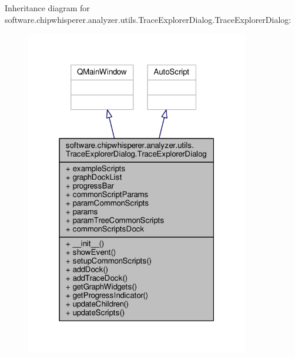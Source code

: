 Inheritance diagram for software.\+chipwhisperer.\+analyzer.\+utils.\+Trace\+Explorer\+Dialog.\+Trace\+Explorer\+Dialog\+:\nopagebreak
\begin{figure}[H]
\begin{center}
\leavevmode
\includegraphics[width=277pt]{d3/d30/classsoftware_1_1chipwhisperer_1_1analyzer_1_1utils_1_1TraceExplorerDialog_1_1TraceExplorerDialog__inherit__graph}
\end{center}
\end{figure}


